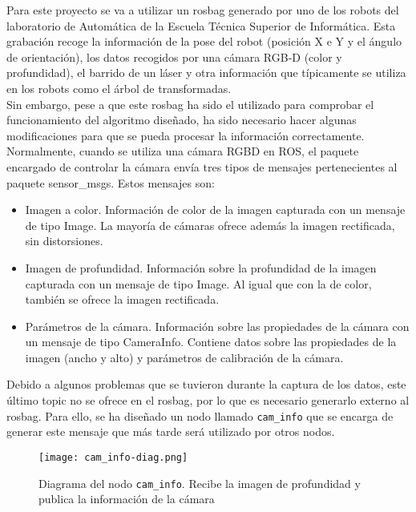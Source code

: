 Para este proyecto se va a utilizar un rosbag generado por uno de los robots del laboratorio de Automática de la Escuela Técnica Superior de Informática. Esta grabación recoge la información de la pose del robot (posición X e Y y el ángulo de orientación), los datos recogidos por una cámara RGB-D (color y profundidad), el barrido de un láser y otra información que típicamente se utiliza en los robots como el árbol de transformadas.\\

Sin embargo, pese a que este rosbag ha sido el utilizado para comprobar el funcionamiento del algoritmo diseñado, ha sido necesario hacer algunas modificaciones para que se pueda procesar la información correctamente.\\

Normalmente, cuando se utiliza una cámara RGBD en ROS, el paquete encargado de controlar la cámara envía tres tipos de mensajes pertenecientes al paquete sensor\_msgs. Estos mensajes son:

\begin{itemize}

	\item Imagen a color. Información de color de la imagen capturada con un mensaje de tipo Image. La mayoría de cámaras ofrece además la imagen rectificada, sin distorsiones.
	\item Imagen de profundidad. Información sobre la profundidad de la imagen capturada con un mensaje de tipo Image. Al igual que con la de color, también se ofrece la imagen rectificada.
	\item Parámetros de la cámara. Información sobre las propiedades de la cámara con un mensaje de tipo CameraInfo. Contiene datos sobre las propiedades de la imagen (ancho y alto) y parámetros de calibración de la cámara.

\end{itemize}

Debido a algunos problemas que se tuvieron durante la captura de los datos, este último topic no se ofrece en el rosbag, por lo que es necesario generarlo externo al rosbag. Para ello, se ha diseñado un nodo llamado \texttt{cam\_info} que se encarga de generar este mensaje que más tarde será utilizado por otros nodos.\\

\begin{figure}[h]
	\begin{center} 
		\texttt{[image: cam\_info-diag.png]}
	\end{center}
	\caption{Diagrama del nodo \texttt{cam\_info}. Recibe la imagen de profundidad y publica la información de la cámara}
	\label{fig:cam_info}
\end{figure}

